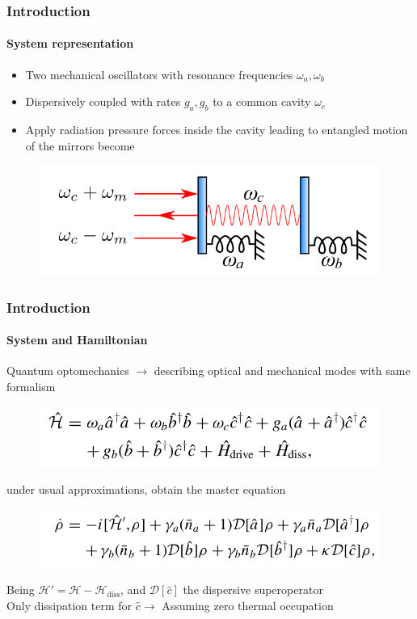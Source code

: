 \documentclass[aspectratio=43]{beamer}
\begin{document}
\begin{frame}

	\frametitle{Introduction}
	\framesubtitle{System representation}
	
	\begin{itemize}
		\item Two mechanical oscillators with resonance frequencies $\omega_{a}, \omega_{b}$
		\item Dispersively coupled with rates $g_{a}, g_{b}$ to a common cavity $\omega_{c}$
		\item Apply radiation pressure forces inside the cavity leading to entangled motion of the mirrors become
	\end{itemize}

		\begin{figure}
			\includegraphics[width = 8 cm]{plots/plot_system.png}
		\end{figure}	

\end{frame}

\begin{frame}
	
	\frametitle{Introduction}
	\framesubtitle{System and Hamiltonian}
	
	Quantum optomechanics $\longrightarrow$ describing optical and mechanical modes with same formalism 
	\begin{figure}
		\includegraphics[width = 8 cm]{plots/hamiltonian_1.png}
	\end{figure}
	
	under usual approximations, obtain the master equation 
	\begin{figure}
		\includegraphics[width = 8 cm]{plots/master_eq_1.png}
	\end{figure}

	Being $\mathcal{H}' = \mathcal{H} - \mathcal{H}_{\textrm{diss}}$, and $\mathcal{D}[\hat{c}]$ the dispersive superoperator\\
	Only dissipation term for $\hat{c} \longrightarrow$ {\color{blue}Assuming zero thermal occupation}
	
\end{frame}
\end{document}
